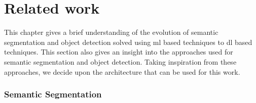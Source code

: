 \lhead{\thepage}
\chapter{Related work}

This chapter gives a brief understanding of the evolution of semantic segmentation and object detection solved using \ac{ml} based techniques to \ac{dl} based techniques. This section also gives an insight into the approaches used for semantic segmentation and object detection. Taking inspiration from these approaches, we decide upon the architecture that can be used for this work. 


\subsection{Semantic Segmentation}

